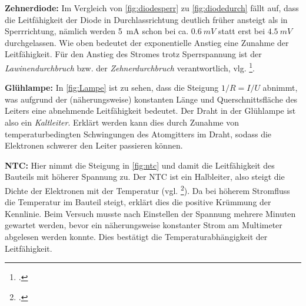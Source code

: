 \textbf{Zehnerdiode:} Im Vergleich von \cref{fig:diodesperr} zu \cref{fig:diodedurch} fällt auf, dass die Leitfähigkeit der Diode in Durchlassrichtung deutlich früher ansteigt als in Sperrrichtung, nämlich werden \SI{5}{mA} schon bei ca. $\SI{0.6}{mV}$ statt erst bei $\SI{4.5}{mV}$ durchgelassen. Wie oben bedeutet der exponentielle Anstieg eine Zunahme der Leitfähigkeit. Für den Anstieg des Stromes trotz Sperrspannung ist der \textit{Lawinendurchbruch} bzw. der \textit{Zehnerdurchbruch} verantwortlich, vlg. \footcite{anleitung-ws2014}.

\textbf{Glühlampe:} In \cref{fig:Lampe} ist zu sehen, dass die Steigung $1/R=I/U$ abnimmt, was aufgrund der (näherungsweise) konstanten Länge und Querschnittsfläche des Leiters eine abnehmende Leitfähigkeit bedeutet. Der Draht in der Glühlampe ist also ein \textit{Kaltleiter}. Erklärt werden kann dies durch Zunahme von temperaturbedingten Schwingungen des Atomgitters im Draht, sodass die Elektronen schwerer den Leiter passieren können.

\textbf{NTC:} Hier nimmt die Steigung in \cref{fig:ntc} und damit die Leitfähigkeit des Bauteils mit höherer Spannung zu. Der NTC ist ein Halbleiter, also steigt die Dichte der Elektronen mit der Temperatur (vgl. \footcite{anleitung-ws2014}). Da bei höherem Stromfluss die Temperatur im Bauteil steigt, erklärt dies die positive Krümmung der Kennlinie. Beim Versuch musste nach Einstellen der Spannung mehrere Minuten gewartet werden, bevor ein näherungsweise konstanter Strom am Multimeter abgelesen werden konnte. Dies bestätigt die Temperaturabhängigkeit der Leitfähigkeit.
